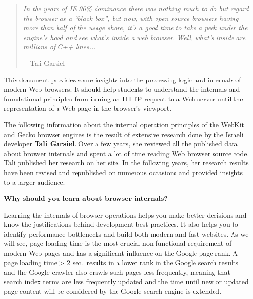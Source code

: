 \documentclass[a4paper, justified, notoc]{tufte-handout} %
\begin{document}
\begin{quote}
	\emph{In the years of IE 90\% dominance there was nothing much to do but regard the browser as a ``black box'', but now, with open source browsers having more than half of the usage share, it's a good time to take a peek under the engine's hood and see what's inside a web browser. Well, what's inside are millions of C++ lines...}\begin{flushright}\vspace{-1em}---Tali Garsiel \end{flushright}
\end{quote}

This document provides some insights into the processing logic and internals of modern Web browsers. It should help students to understand the internals and foundational principles from issuing an HTTP request to a Web server until the representation of a Web page in the browser's viewport. 

The following information about the internal operation principles of the WebKit and Gecko browser engines is the result of extensive research done by the Israeli developer \textbf{Tali Garsiel}. Over a few years, she reviewed all the published data about browser internals and spent a lot of time reading Web browser source code. Tali published her research on her site. In the following years, her research results have been revised and republished on numerous occasions and provided insights to a larger audience. 

\textbf{Why should you learn about browser internals?}

Learning the internals of browser operations helps you make better decisions and know the justifications behind development best practices. It also helps you to identify performance bottlenecks and build both modern and fast websites. As we will see, page loading time is the most crucial non-functional requirement of modern Web pages and has a significant influence on the Google page rank. A page loading time > 2 sec.\ results in a lower rank in the Google search results and the Google crawler also crawls such pages less frequently, meaning that  search index terms are less frequently updated and the time until new or updated page content will be considered by the Google search engine is extended.   







\end{document}
